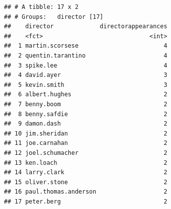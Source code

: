\documentclass[]{article}
\newenvironment{Shaded}{\begin{snugshade}}{\end{snugshade}}
\newcommand{\DataTypeTok}[1]{\textcolor[rgb]{0.13,0.29,0.53}{#1}}
\newcommand{\DecValTok}[1]{\textcolor[rgb]{0.00,0.00,0.81}{#1}}
\newcommand{\KeywordTok}[1]{\textcolor[rgb]{0.13,0.29,0.53}{\textbf{#1}}}
\newcommand{\NormalTok}[1]{#1}
\newcommand{\OperatorTok}[1]{\textcolor[rgb]{0.81,0.36,0.00}{\textbf{#1}}}
\newcommand{\StringTok}[1]{\textcolor[rgb]{0.31,0.60,0.02}{#1}}
\begin{document}
\begin{Shaded}
\end{Shaded}

\begin{verbatim}
## # A tibble: 17 x 2
## # Groups:   director [17]
##    director             directorappearances
##    <fct>                              <int>
##  1 martin.scorsese                        4
##  2 quentin.tarantino                      4
##  3 spike.lee                              4
##  4 david.ayer                             3
##  5 kevin.smith                            3
##  6 albert.hughes                          2
##  7 benny.boom                             2
##  8 benny.safdie                           2
##  9 damon.dash                             2
## 10 jim.sheridan                           2
## 11 joe.carnahan                           2
## 12 joel.schumacher                        2
## 13 ken.loach                              2
## 14 larry.clark                            2
## 15 oliver.stone                           2
## 16 paul.thomas.anderson                   2
## 17 peter.berg                             2
\end{verbatim}

\begin{Shaded}
\end{Shaded}
\end{document}
